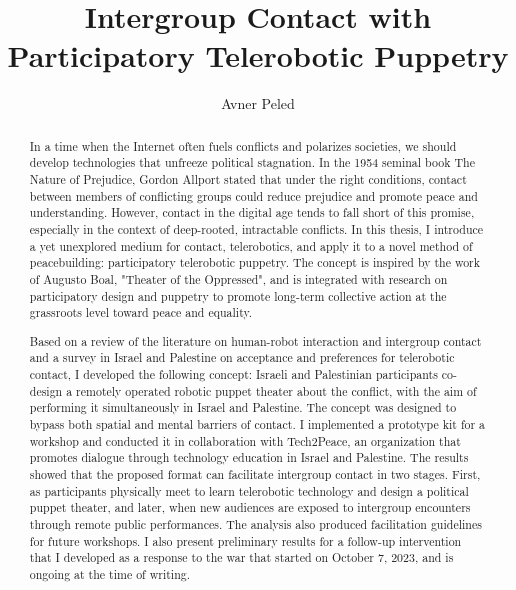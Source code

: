 \documentclass[dissertation,math,vertlayout,pdfa,colorlinks]{aaltoseries}
\author{Avner Peled}
\title{Intergroup Contact with Participatory Telerobotic Puppetry}
\begin{document}
\draftabstract{
}%


\begin{abstract}
In a time when the Internet often fuels conflicts and polarizes societies, we should develop technologies that unfreeze political stagnation. In the 1954 seminal book The Nature of Prejudice, Gordon Allport stated that under the right conditions, contact between members of conflicting groups could reduce prejudice and promote peace and understanding. However, contact in the digital age tends to fall short of this promise, especially in the context of deep-rooted, intractable conflicts. In this thesis, I introduce a yet unexplored medium for contact, telerobotics, and apply it to a novel method of peacebuilding: participatory telerobotic puppetry. The concept is inspired by the work of Augusto Boal, "Theater of the Oppressed", and is integrated with research on participatory design and puppetry to promote long-term collective action at the grassroots level toward peace and equality.

Based on a review of the literature on human-robot interaction and intergroup contact and a survey in Israel and Palestine on acceptance and preferences for telerobotic contact, I developed the following concept: Israeli and Palestinian participants co-design a remotely operated robotic puppet theater about the conflict, with the aim of performing it simultaneously in Israel and Palestine. The concept was designed to bypass both spatial and mental barriers of contact. I implemented a prototype kit for a workshop and conducted it in collaboration with Tech2Peace, an organization that promotes dialogue through technology education in Israel and Palestine. The results showed that the proposed format can facilitate intergroup contact in two stages. First, as participants physically meet to learn telerobotic technology and design a political puppet theater, and later, when new audiences are exposed to intergroup encounters through remote public performances. The analysis also produced facilitation guidelines for future workshops. I also present preliminary results for a follow-up intervention that I developed as a response to the war that started on October 7, 2023, and is ongoing at the time of writing.


\end{abstract}
\end{document}
